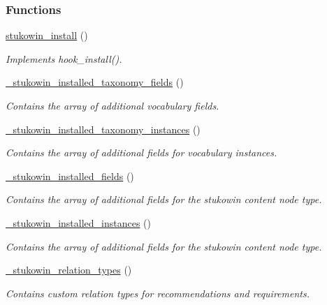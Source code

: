 \subsubsection*{Functions}
\begin{DoxyCompactItemize}
\item 
\hyperlink{group___stukowin___module_ga67989d3a763f2efa2fc0b07460639558}{stukowin\+\_\+install} ()
\begin{DoxyCompactList}\small\item\em Implements hook\+\_\+install(). \end{DoxyCompactList}\item 
\hyperlink{group___stukowin___module_ga0dbd0252e3db9efdb3cfefbefecf3d2e}{\+\_\+stukowin\+\_\+installed\+\_\+taxonomy\+\_\+fields} ()
\begin{DoxyCompactList}\small\item\em Contains the array of additional vocabulary fields. \end{DoxyCompactList}\item 
\hyperlink{group___stukowin___module_gafd634a2fb5766e1053fa7df79ab11c79}{\+\_\+stukowin\+\_\+installed\+\_\+taxonomy\+\_\+instances} ()
\begin{DoxyCompactList}\small\item\em Contains the array of additional fields for vocabulary instances. \end{DoxyCompactList}\item 
\hyperlink{group___stukowin___module_ga5eda7b9b561e8a5ad87df0bb50cf80b0}{\+\_\+stukowin\+\_\+installed\+\_\+fields} ()
\begin{DoxyCompactList}\small\item\em Contains the array of additional fields for the stukowin content node type. \end{DoxyCompactList}\item 
\hyperlink{group___stukowin___module_ga473e908d001c086718d6675f19cb7ee7}{\+\_\+stukowin\+\_\+installed\+\_\+instances} ()
\begin{DoxyCompactList}\small\item\em Contains the array of additional fields for the stukowin content node type. \end{DoxyCompactList}\item 
\hyperlink{group___stukowin___module_gae7b4c9b6b19887d0ccc914b2886010ce}{\+\_\+stukowin\+\_\+relation\+\_\+types} ()
\begin{DoxyCompactList}\small\item\em Contains custom relation types for recommendations and requirements. \end{DoxyCompactList}\item 

\end{DoxyCompactItemize}
